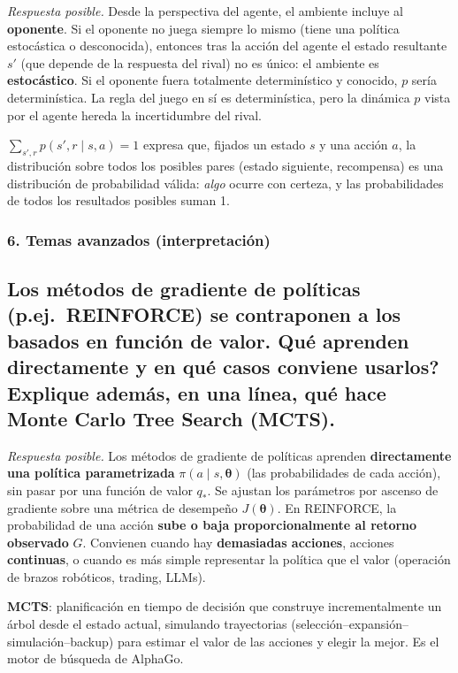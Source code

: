 \documentclass[11pt, a4paper]{article}
\newcommand{\pregunta}[1]{\subsection{#1}}
\newcommand{\eje}[1]{\subsubsection{#1}}
\begin{document}
\begin{respuesta}
\textit{Respuesta posible.} Desde la perspectiva del agente, el ambiente incluye al \textbf{oponente}. Si el oponente no juega siempre lo mismo (tiene una pol\'itica estoc\'astica o desconocida), entonces tras la acci\'on del agente el estado resultante $s'$ (que depende de la respuesta del rival) no es \'unico: el ambiente es \textbf{estoc\'astico}. Si el oponente fuera totalmente determin\'istico y conocido, $p$ ser\'ia determin\'istica. La regla del juego en s\'i es determin\'istica, pero la din\'amica $p$ vista por el agente hereda la incertidumbre del rival.

$\sum_{s',r} p(s',r\mid s,a)=1$ expresa que, fijados un estado $s$ y una acci\'on $a$, la distribuci\'on sobre todos los posibles pares (estado siguiente, recompensa) es una distribuci\'on de probabilidad v\'alida: \emph{algo} ocurre con certeza, y las probabilidades de todos los resultados posibles suman 1.
\end{respuesta}

\eje{6. Temas avanzados (interpretaci\'on)}
\pregunta{Los m\'etodos de \textbf{gradiente de pol\'iticas} (p.ej.\ REINFORCE) se contraponen a los basados en funci\'on de valor. \textquestiondown Qu\'e aprenden directamente y en qu\'e casos conviene usarlos? Explique adem\'as, en una l\'inea, qu\'e hace \textbf{Monte Carlo Tree Search (MCTS)}.}

\begin{respuesta}
\textit{Respuesta posible.} Los m\'etodos de gradiente de pol\'iticas aprenden \textbf{directamente una pol\'itica parametrizada} $\pi(a\mid s,\boldsymbol\theta)$ (las probabilidades de cada acci\'on), sin pasar por una funci\'on de valor $q_*$. Se ajustan los par\'ametros por ascenso de gradiente sobre una m\'etrica de desempe\~no $J(\boldsymbol\theta)$. En REINFORCE, la probabilidad de una acci\'on \textbf{sube o baja proporcionalmente al retorno observado} $G$. Convienen cuando hay \textbf{demasiadas acciones}, acciones \textbf{continuas}, o cuando es m\'as simple representar la pol\'itica que el valor (operaci\'on de brazos rob\'oticos, trading, LLMs).

\textbf{MCTS}: planificaci\'on en tiempo de decisi\'on que construye incrementalmente un \'arbol desde el estado actual, simulando trayectorias (selecci\'on--expansi\'on--simulaci\'on--backup) para estimar el valor de las acciones y elegir la mejor. Es el motor de b\'usqueda de AlphaGo.
\end{respuesta}
\end{document}
